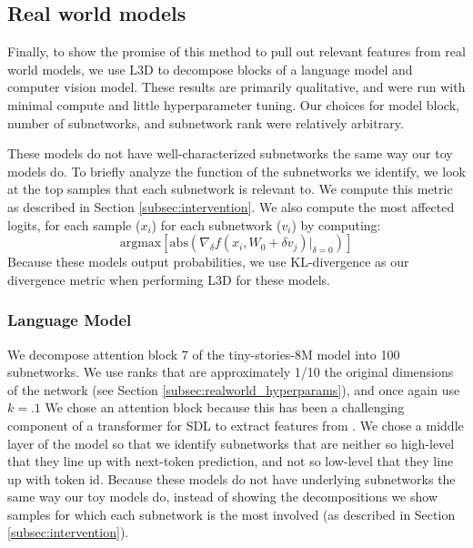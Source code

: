 \documentclass{article}
\theoremstyle{plain}
\theoremstyle{definition}
\theoremstyle{remark}
\begin{document}
\subsection{Real world models}

Finally, to show the promise of this method to pull out relevant features from real world models, we use L3D to decompose blocks of a language model and computer vision model.  These results are primarily qualitative, and were run with minimal compute and little hyperparameter tuning. Our choices for model block, number of subnetworks, and subnetwork rank were relatively arbitrary.  

These models do not have well-characterized subnetworks the same way our toy models do. To briefly analyze the function of the subnetworks we identify, we look at the top samples that each subnetwork is relevant to.  We compute this metric as described in Section \ref{subsec:intervention}. We also compute the most affected logits, for each sample ($x_i$) for each subnetwork ($v_i$) by computing:
\begin{equation}
\text{argmax}[\text{abs}(\nabla_\delta f(x_i, W_0 + \delta v_j) |_{\delta=0})]
\end{equation}
Because these models output probabilities, we use KL-divergence as our divergence metric when performing L3D for these models.

\subsubsection{Language Model}

We decompose attention block 7 of the tiny-stories-8M model into 100 subnetworks.  We use ranks that are approximately 1/10 the original dimensions of the network (see Section \ref{subsec:realworld_hyperparams}), and once again use $k=.1$  We chose an attention block because this has been a challenging component of a transformer for SDL to extract features from \cite{sharkey2025open}. We chose a middle layer of the model so that we identify subnetworks that are neither so high-level that they line up  with next-token prediction, and not so low-level that they line up with token id. Because these models do not have underlying subnetworks the same way our toy models do, instead of showing the decompositions we show samples for which each subnetwork is the most involved (as described in Section \ref{subsec:intervention}). 
\end{document}
